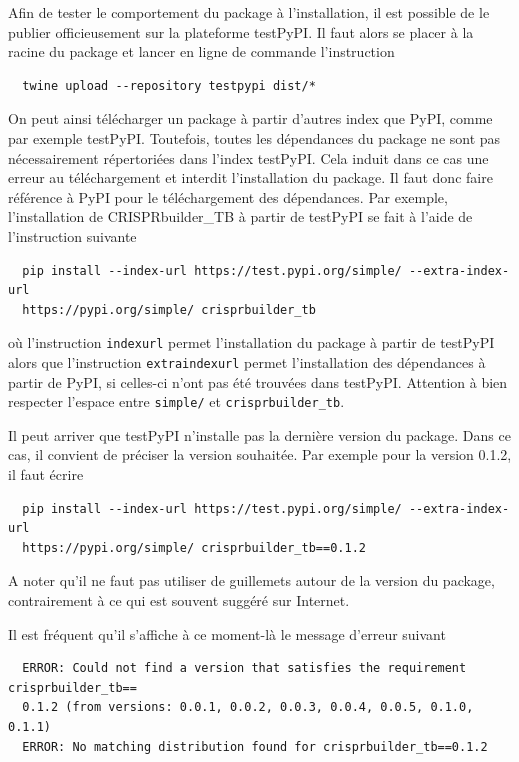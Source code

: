 \documentclass[twoside,a4paper,11pt,frenchb,openany]{report}
\begin{document}
Afin de tester le comportement du package à l'installation, il est possible de le publier officieusement sur la plateforme testPyPI. Il faut alors se placer à la racine du package et lancer en ligne de commande l'instruction
\begin{verbatim}  twine upload --repository testpypi dist/*\end{verbatim}

On peut ainsi télécharger un package à partir d'autres index que PyPI, comme par exemple testPyPI. Toutefois, toutes les dépendances du package ne sont pas nécessairement répertoriées dans l'index testPyPI. Cela induit dans ce cas une erreur au téléchargement et interdit l'installation du package. Il faut donc faire référence à PyPI pour le téléchargement des dépendances. Par exemple, l'installation de CRISPRbuilder\_TB à partir de testPyPI se fait à l'aide de l'instruction suivante

\begin{verbatim}  pip install --index-url https://test.pypi.org/simple/ --extra-index-url 
  https://pypi.org/simple/ crisprbuilder_tb\end{verbatim} 

où l'instruction \texttt{\textemdash \textemdash index\textemdash url} permet l'installation du package à partir de testPyPI alors que l'instruction \texttt{\textemdash \textemdash extra\textemdash index\textemdash url} permet l'installation des dépendances à partir de PyPI, si celles-ci n'ont pas été trouvées dans testPyPI. Attention à bien respecter l'espace entre \texttt{simple/} et \texttt{crisprbuilder\_tb}.

Il peut arriver que testPyPI n'installe pas la dernière version du package. Dans ce cas, il convient de préciser la version souhaitée. Par exemple pour la version 0.1.2, il faut écrire

\begin{verbatim}  pip install --index-url https://test.pypi.org/simple/ --extra-index-url 
  https://pypi.org/simple/ crisprbuilder_tb==0.1.2\end{verbatim} 

A noter qu'il ne faut pas utiliser de guillemets autour de la version du package, contrairement à ce qui est souvent suggéré sur Internet.

Il est fréquent qu'il s'affiche à ce moment-là le message d'erreur suivant

\begin{verbatim}  ERROR: Could not find a version that satisfies the requirement crisprbuilder_tb==
  0.1.2 (from versions: 0.0.1, 0.0.2, 0.0.3, 0.0.4, 0.0.5, 0.1.0, 0.1.1)
  ERROR: No matching distribution found for crisprbuilder_tb==0.1.2\end{verbatim}
\end{document}
